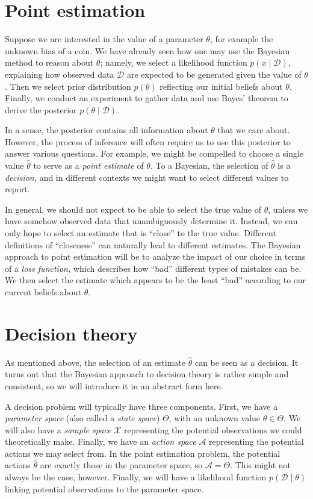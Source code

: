 \documentclass{article}
\newcommand{\given}{\mid}
\newcommand{\mc}[1]{\mathcal{#1}}
\newcommand{\data}{\mc{D}}
\begin{document}
\section*{Point estimation}

Suppose we are interested in the value of a parameter $\theta$, for
example the unknown bias of a coin.  We have already seen how one may
use the Bayesian method to reason about $\theta$; namely, we select a
likelihood function $p(x \given \data)$, explaining how observed data
$\data$ are expected to be generated given the value of $\theta$.
Then we select prior distribution $p(\theta)$ reflecting our initial
beliefs about $\theta$.  Finally, we conduct an experiment to gather
data and use Bayes' theorem to derive the posterior $p(\theta \given
\data)$.

In a sense, the posterior contains all information about $\theta$ that
we care about.  However, the process of inference will often require
us to use this posterior to answer various questions.  For example, we
might be compelled to choose a single value $\hat{\theta}$ to serve as
a \emph{point estimate} of $\theta$.  To a Bayesian, the selection of
$\hat{\theta}$ is a \emph{decision,} and in different contexts we
might want to select different values to report.

In general, we should not expect to be able to select the true value
of $\theta$, unless we have somehow observed data that unambiguously
determine it.  Instead, we can only hope to select an estimate that is
``close'' to the true value.  Different definitions of ``closeness''
can naturally lead to different estimates. The Bayesian approach to
point estimation will be to analyze the impact of our choice in terms
of a \emph{loss function,} which describes how ``bad'' different types
of mistakes can be.  We then select the estimate which appears to be
the least ``bad'' according to our current beliefs about $\theta$.

\section*{Decision theory}

As mentioned above, the selection of an estimate $\hat{\theta}$ can be
seen as a decision.  It turns out that the Bayesian approach to
decision theory is rather simple and consistent, so we will introduce
it in an abstract form here.

A decision problem will typically have three components.  First, we
have a \emph{parameter space} (also called a \emph{state space})
$\Theta$, with an unknown value $\theta \in \Theta$.  We will also
have a \emph{sample space} $\mc{X}$ representing the potential
observations we could theoretically make.  Finally, we have an
\emph{action space} $\mc{A}$ representing the potential actions we may
select from.  In the point estimation problem, the potential actions
$\hat{\theta}$ are exactly those in the parameter space, so $\mc{A} =
\Theta$.  This might not always be the case, however.  Finally, we
will have a likelihood function $p(\data \given \theta)$ linking
potential observations to the parameter space.
\end{document}
